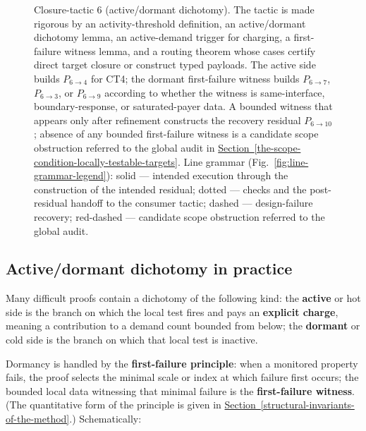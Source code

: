 \documentclass[
  11pt,
]{article}
\theoremstyle{definition}
\newcommand{\secref}[1]{\hyperref[#1]{Section~\ref*{#1}}}
\begin{document}
\begin{figure}[p]
{%
}
\caption[Closure-tactic 6: active/dormant dichotomy]{Closure-tactic 6 (active/dormant dichotomy).  The tactic is made rigorous by an activity-threshold definition, an active/dormant dichotomy lemma, an active-demand trigger for charging, a first-failure witness lemma, and a routing theorem whose cases certify direct target closure or construct typed payloads.  The active side builds \(P_{6\to4}\) for CT4; the dormant first-failure witness builds \(P_{6\to7}\), \(P_{6\to3}\), or \(P_{6\to9}\) according to whether the witness is same-interface, boundary-response, or saturated-payer data.  A bounded witness that appears only after refinement constructs the recovery residual \(P_{6\to10}\); absence of any bounded first-failure witness is a candidate scope obstruction referred to the global audit in \secref{the-scope-condition-locally-testable-targets}.  Line grammar (Fig.~\ref{fig:line-grammar-legend}): solid --- intended execution through the construction of the intended residual; dotted --- checks and the post-residual handoff to the consumer tactic; dashed --- design-failure recovery; red-dashed --- candidate scope obstruction referred to the global audit.}
\label{fig:ct6-active-dormant}
\end{figure}
\FloatBarrier

\subsection*{Active/dormant dichotomy in practice}

Many difficult proofs contain a dichotomy of the following kind:
the \textbf{active} or hot side is the branch on which the local test
fires and pays an \textbf{explicit charge}, meaning a contribution to a
demand count bounded from below; the \textbf{dormant} or cold side is
the branch on which that local test is inactive.

Dormancy is handled by the \textbf{first-failure principle}: when a
monitored property fails, the proof selects the minimal scale or index
at which failure first occurs; the bounded local data witnessing that
minimal failure is the \textbf{first-failure witness}. (The quantitative
form of the principle is given in \secref{structural-invariants-of-the-method}.) Schematically:
\end{document}
